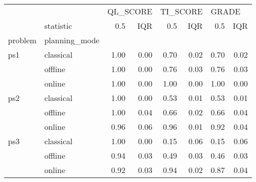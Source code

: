 \begin{tabular}{llrrrrrr}
\toprule
    & {} & \multicolumn{2}{l}{QL\_SCORE} & \multicolumn{2}{l}{TI\_SCORE} & \multicolumn{2}{l}{GRADE} \\
    & statistic &      0.5 &  IQR &      0.5 &  IQR &   0.5 &  IQR \\
problem & planning\_mode &          &      &          &      &       &      \\
\midrule
ps1 & classical &     1.00 & 0.00 &     0.70 & 0.02 &  0.70 & 0.02 \\
    & offline &     1.00 & 0.00 &     0.76 & 0.03 &  0.76 & 0.03 \\
    & online &     1.00 & 0.00 &     1.00 & 0.00 &  1.00 & 0.00 \\
ps2 & classical &     1.00 & 0.00 &     0.53 & 0.01 &  0.53 & 0.01 \\
    & offline &     1.00 & 0.04 &     0.66 & 0.02 &  0.66 & 0.04 \\
    & online &     0.96 & 0.06 &     0.96 & 0.01 &  0.92 & 0.04 \\
ps3 & classical &     1.00 & 0.00 &     0.15 & 0.06 &  0.15 & 0.06 \\
    & offline &     0.94 & 0.03 &     0.49 & 0.03 &  0.46 & 0.03 \\
    & online &     0.92 & 0.03 &     0.94 & 0.02 &  0.87 & 0.04 \\
\bottomrule
\end{tabular}
